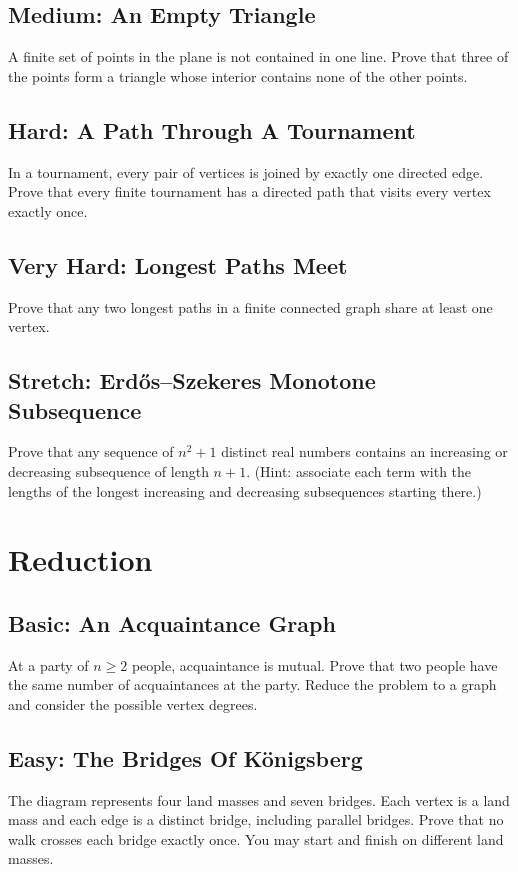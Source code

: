 \documentclass[12pt]{article}
\begin{document}
\subsection*{Medium: An Empty Triangle}
A finite set of points in the plane is not contained in one line.
Prove that three of the points form a triangle whose interior contains
none of the other points.

\subsection*{Hard: A Path Through A Tournament}
In a tournament, every pair of vertices is joined by exactly one
directed edge. Prove that every finite tournament has a directed path
that visits every vertex exactly once.

\subsection*{Very Hard: Longest Paths Meet}
Prove that any two longest paths in a finite connected graph share at
least one vertex.

\subsection*{Stretch: Erd\H{o}s--Szekeres Monotone Subsequence}
Prove that any sequence of $n^2+1$ distinct real numbers contains an
increasing or decreasing subsequence of length $n+1$. (Hint: associate
each term with the lengths of the longest increasing and decreasing
subsequences starting there.)

\section{Reduction}

\subsection*{Basic: An Acquaintance Graph}
At a party of $n\ge2$ people, acquaintance is mutual. Prove that two
people have the same number of acquaintances at the party. Reduce the
problem to a graph and consider the possible vertex degrees.

\subsection*{Easy: The Bridges Of K\"onigsberg}
The diagram represents four land masses and seven bridges. Each vertex
is a land mass and each edge is a distinct bridge, including parallel
bridges. Prove that no walk crosses each bridge exactly once. You may
start and finish on different land masses.
\end{document}
